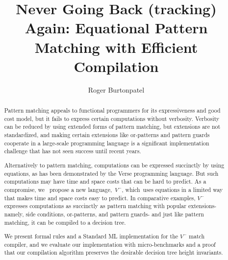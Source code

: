 \documentclass[article,screen,12pt, nonacm]{acmart}
\begin{document}
\title{Never Going Back (tracking) Again: Equational Pattern Matching with Efficient Compilation}
\author{Roger Burtonpatel}





\renewcommand{\shortauthors}{Burtonpatel}

\begin{abstract}
    Pattern matching appeals to functional programmers for its expressiveness
    and good cost model, but it fails to express certain computations without
    verbosity. Verbosity can be reduced by using extended forms of pattern
    matching, but extensions are not standardized, and making certain extensions
    like or-patterns and pattern guards cooperate in a large-scale programming
    language is a significant implementation challenge that has not seen success
    until recent years. 
    
    Alternatively to pattern matching, computations can be expressed succinctly
    by using equations, as has been demonstrated by the Verse programming
    language. But such computations may have time and space costs that can be
    hard to predict. As a compromise, we ~propose a new language,~\ensuremath{V^{-}},
    which~uses equations in a limited way that makes time and space costs easy
    to predict. In comparative examples, \ensuremath{V^{-}}~ expresses computations as
    succinctly as pattern matching with popular extensions- namely, side
    conditions, or-patterns, and pattern guards- and just like pattern matching,
    it can be compiled to a decision tree. 
    
    We present formal rules and a Standard ML implementation for the \ensuremath{V^{-}}
    match compiler, and we evaluate our implementation with micro-benchmarks and
    a proof that our compilation algorithm preserves the desirable decision tree
    height invariants. 

\end{abstract}

\maketitle



\end{document}

